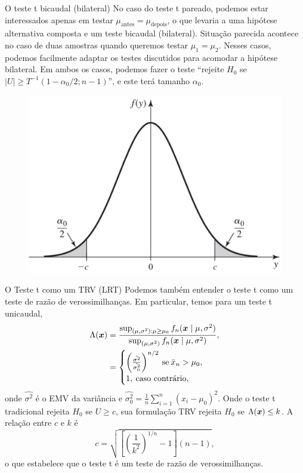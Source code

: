 \begin{frame}{O teste t bicaudal (bilateral)}
No caso do  teste t pareado, podemos estar interessados apenas em testar $\mu_{\text{antes}}= \mu_{\text{depois}}$, o que levaria a uma hipótese alternativa composta e um teste bicaudal (bilateral).
Situação parecida acontece no caso de duas amostras quando queremos testar $\mu_1 = \mu_2$.
Nesses casos, podemos facilmente adaptar os testes discutidos para acomodar a hipótese bilateral.
Em ambos os casos, podemos fazer o teste ``rejeite $H_0$ se $|U|\geq T^{-1}(1-\alpha_0/2; n-1)$'', e este terá tamanho $\alpha_0$.
\begin{figure}
 \begin{center}
  \includegraphics[scale=0.3]{figures/bilateral.pdf}
 \end{center}
\end{figure}
\end{frame}

\begin{frame}{O Teste t como um TRV (LRT)}
Podemos também entender o teste t como um teste de razão de verossimilhanças.
Em particular, temos para um teste t unicaudal, 
\begin{align*}
 \Lambda(\boldsymbol{x}) &= \frac{\sup_{(\mu, \sigma^2):\mu \geq \mu_0} f_n(\boldsymbol{x} \mid \mu, \sigma^2) }{\sup_{(\mu, \sigma^2)} f_n(\boldsymbol{x} \mid \mu, \sigma^2)}, \\
 &=  \begin{cases}
     \left(\frac{\hat{\sigma^2}}{\hat{\sigma_0^2}}\right)^{n/2} \: \text{se} \: \bar{x}_n> \mu_0,\\
     1,\:\text{caso contrário},
\end{cases} 
\end{align*}
onde $\hat{\sigma^2}$ é o EMV da variância e $\hat{\sigma_0^2} = \frac{1}{n}\sum_{i=1}^n (x_i-\mu_0)^2$.
Onde o teste t tradicional rejeita $H_0$ se $U\geq c$, sua formulação TRV rejeita $H_0$ se $\Lambda(\boldsymbol{x}) \leq k$.
A relação entre $c$ e $k$ é 
\begin{equation*}
 c = \sqrt{\left[\left(\frac{1}{k^2}\right)^{1/n} - 1 \right](n-1)}, 
\end{equation*}
o que estabelece que o teste t é um teste de razão de verossimilhanças.
\end{frame}

